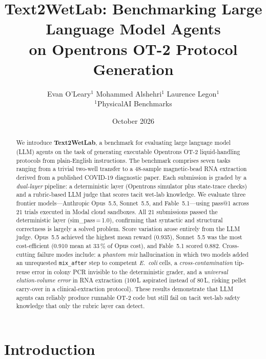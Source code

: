\documentclass[11pt,a4paper]{article}
\title{\textbf{Text2WetLab: Benchmarking Large Language Model Agents\\
on Opentrons OT-2 Protocol Generation}}
\author{
  Evan O'Leary$^{1}$ \quad
  Mohammed Alshehri$^{1}$ \quad
  Laurence Legon$^{1}$
  \\[6pt]
  \small $^{1}$PhysicalAI Benchmarks
}
\date{October 2026}
\begin{document}
\maketitle
\thispagestyle{empty}

\begin{abstract}
We introduce \textbf{Text2WetLab}, a benchmark for evaluating large language
model (LLM) agents on the task of generating executable Opentrons OT-2
liquid-handling protocols from plain-English instructions.
The benchmark comprises seven tasks ranging from a trivial two-well
transfer to a 48-sample magnetic-bead RNA extraction derived from a
published COVID-19 diagnostic paper.
Each submission is graded by a \emph{dual-layer} pipeline: a deterministic
layer (Opentrons simulator plus state-trace checks) and a rubric-based LLM
judge that scores tacit wet-lab knowledge.
We evaluate three frontier models---Anthropic Opus~5.5, Sonnet~5.5, and
Fable~5.1---using pass@1 across 21 trials executed in Modal cloud sandboxes.
All 21 submissions passed the deterministic layer (sim\_pass\,=\,1.0),
confirming that syntactic and structural correctness is largely a solved
problem.
Score variation arose entirely from the LLM judge.
Opus~5.5 achieved the highest mean reward (0.935), Sonnet~5.5 was the most
cost-efficient (0.910 mean at 33\,\% of Opus cost), and Fable~5.1 scored
0.882.
Cross-cutting failure modes include: a \emph{phantom mix} hallucination in
which two models added an unrequested \texttt{mix\_after} step to competent
\emph{E.~coli} cells, a \emph{cross-contamination} tip-reuse error in
colony PCR invisible to the deterministic grader, and a \emph{universal
elution-volume error} in RNA extraction (100\,\textmu L aspirated instead of
80\,\textmu L, risking pellet carry-over in a clinical-extraction protocol).
These results demonstrate that LLM agents can reliably produce runnable
OT-2 code but still fail on tacit wet-lab safety knowledge that only the
rubric layer can detect.
\end{abstract}

\tableofcontents
\newpage

\section{Introduction}
\label{sec:intro}
\end{document}

